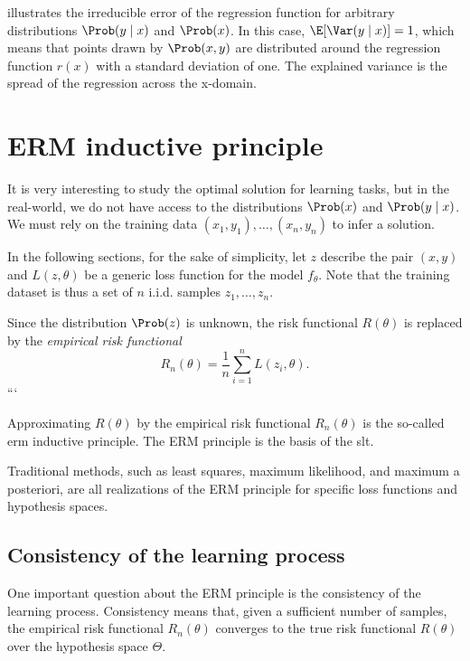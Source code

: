 illustrates the irreducible error of the
regression function for arbitrary distributions $\Prob(y \mid x)$ and $\Prob(x)$.
In this case, $\E\!\left[ \Var(y \mid x) \right] = 1$, which means that points drawn
by $\Prob(x, y)$ are distributed around the regression function $r(x)$ with a standard
deviation of one.  The explained variance is the spread of the regression across the
x-domain.

\section{ERM inductive principle}

It is very interesting to study the optimal solution for learning tasks, but in the
real-world, we do not have access to the distributions $\Prob(x)$ and $\Prob(y \mid x)$.
We must rely on the training data $(x_1, y_1), \dots, (x_n, y_n)$ to infer a solution.

In the following sections, for the sake of simplicity, let $z$ describe the pair $(x, y)$
and $L(z, \theta)$ be a generic loss function for the model $f_\theta$.  Note that the
training dataset is thus a set of $n$ i.i.d. samples $z_1, \dots, z_n$.

Since the distribution $\Prob(z)$ is unknown, the risk functional $R(\theta)$ is replaced by
the \emph{empirical risk functional}
\begin{equation}
  \label{eq:empirical-risk}
  R_n(\theta) = \frac{1}{n} \sum_{i=1}^n L(z_i, \theta)\text{.}
\end{equation}
```

Approximating $R(\theta)$ by the empirical risk functional $R_n(\theta)$ is the so-called
\gls{erm} inductive principle.  The ERM principle is the basis of the \gls{slt}.

Traditional methods, such as least squares, maximum likelihood, and maximum a posteriori, are
all realizations of the ERM principle for specific loss functions and hypothesis spaces.

\subsection{Consistency of the learning process}

One important question about the ERM principle is the consistency of the learning process.
Consistency means that, given a sufficient number of samples, the empirical risk
functional $R_n(\theta)$ converges to the true risk functional $R(\theta)$ over the
hypothesis space $\Theta$.

